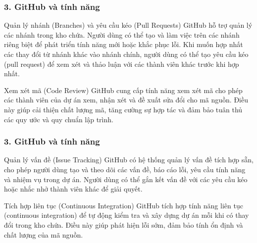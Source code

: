 \documentclass{beamer}
\begin{document}

\begin{frame}
\frametitle{ 3. GitHub và tính năng}

\begin{block}{ Quản lý nhánh (Branches) và yêu cầu kéo (Pull Requests)}
GitHub hỗ trợ quản lý các nhánh trong kho chứa. Người dùng có thể tạo và làm việc trên các nhánh riêng biệt để phát triển tính năng mới hoặc khắc phục lỗi. Khi muốn hợp nhất các thay đổi từ nhánh khác vào nhánh chính, người dùng có thể tạo yêu cầu kéo (pull request) để xem xét và thảo luận với các thành viên khác trước khi hợp nhất.
\end{block}
\begin{block}{ Xem xét mã (Code Review)}
 GitHub cung cấp tính năng xem xét mã cho phép các thành viên của dự án xem, nhận xét và đề xuất sửa đổi cho mã nguồn. Điều này giúp cải thiện chất lượng mã, tăng cường sự hợp tác và đảm bảo tuân thủ các quy ước và quy chuẩn lập trình.
\end{block}

\end{frame}


\begin{frame}
\frametitle{ 3. GitHub và tính năng}

\begin{block}{ Quản lý vấn đề (Issue Tracking)}
GitHub có hệ thống quản lý vấn đề tích hợp sẵn, cho phép người dùng tạo và theo dõi các vấn đề, báo cáo lỗi, yêu cầu tính năng và nhiệm vụ trong dự án. Người dùng có thể gắn kết vấn đề với các yêu cầu kéo hoặc nhắc nhở thành viên khác để giải quyết.
\end{block}
\begin{block}{ Tích hợp liên tục (Continuous Integration)}
 GitHub tích hợp tính năng liên tục (continuous integration) để tự động kiểm tra và xây dựng dự án mỗi khi có thay đổi trong kho chứa. Điều này giúp phát hiện lỗi sớm, đảm bảo tính ổn định và chất lượng của mã nguồn.
\end{block}

\end{frame}

\end{document}

